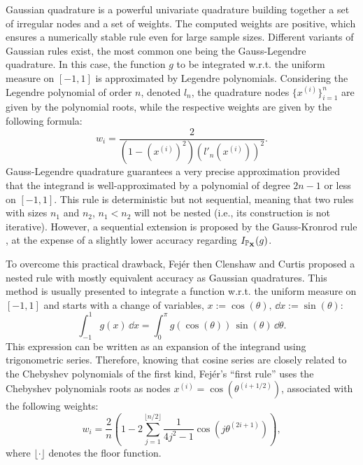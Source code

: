 Gaussian quadrature is a powerful univariate quadrature building together a set of irregular nodes and a set of weights. 
The computed weights are positive, which ensures a numerically stable rule even for large sample sizes.
Different variants of Gaussian rules exist, the most common one being the Gauss-Legendre quadrature. 
In this case, the function $g$ to be integrated w.r.t. the uniform measure on $[-1, 1]$ is approximated by Legendre polynomials. 
Considering the Legendre polynomial of order $n$, denoted $l_n$, the quadrature nodes $\{x^{(i)}\}_{i=1}^n$ are given by the polynomial roots, while the respective weights are given by the following formula: 
\begin{equation}
    w_{i}={\frac {2}{\left(1-\left(x^{(i)}\right)^{2}\right)\left(l'_{n}(x^{(i)})\right)^{2}}}.
\end{equation}
Gauss-Legendre quadrature guarantees a very precise approximation provided that the integrand is well-approximated by a polynomial of degree $2n-1$ or less on $[-1, 1]$.
This rule is deterministic but not sequential, meaning that two rules with sizes $n_1$ and $n_2$, $n_1 < n_2$ will not be nested (i.e., its construction is not iterative). 
However, a sequential extension is proposed by the Gauss-Kronrod rule \citep{laurie_1997}, at the expense of a slightly lower accuracy regarding $I_{\mathbb{P}_{{\bf X}}}(g)$. 

To overcome this practical drawback, Fej\'{e}r \citep{fejer_1933} then Clenshaw and Curtis \citep{clenshaw_1960} proposed a nested rule with mostly equivalent accuracy as Gaussian quadratures.
This method is usually presented to integrate a function w.r.t. the uniform measure on $[-1, 1]$ and starts with a change of variables, $x:=\cos(\theta), \, \dd x := \sin(\theta)$:
\begin{equation}
    \int_{-1}^{1} g(x) \, \dd x = \int_{0}^{\pi} g\left(\cos(\theta)\right) \, \sin(\theta) \, \dd \theta. 
\end{equation}
This expression can be written as an expansion of the integrand using trigonometric series. 
Therefore, knowing that cosine series are closely related to the Chebyshev polynomials of the first kind, 
Fej\'{e}r's ``first rule'' \citep{trefethen_2008} uses the Chebyshev polynomials roots as nodes $x^{(i)} = \cos(\theta^{(i+1/2)})$, associated with the following weights:
\begin{equation}
    w_i=\frac{2}{n}\left(1-2\sum_{j=1}^{\lfloor n/2 \rfloor}\frac{1}{4j^2-1}\cos\left(j\theta^{(2i+1)}\right)\right),    
\end{equation}
where $\lfloor \cdot \rfloor$ denotes the floor function. 

